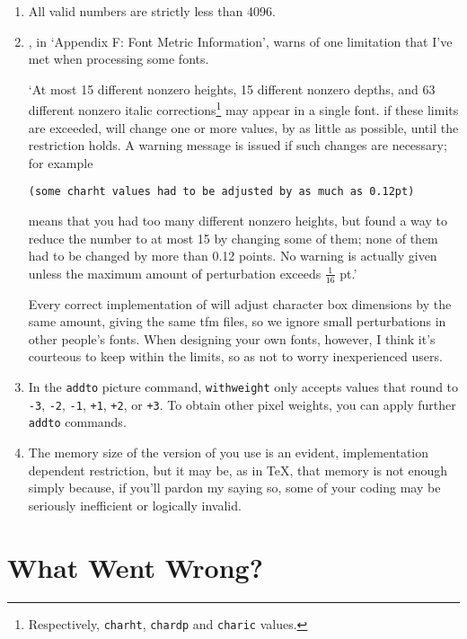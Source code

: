 \begin{enumerate}
\item
All valid numbers are strictly less than 4096.

\item
\MFbook{}, in `Appendix F: Font Metric Information',
warns of one limitation that I've met when processing some fonts.

`At most 15 different nonzero heights, 15 different nonzero depths,
and 63 different nonzero italic corrections\footnote{Respectively,
{\tt charht}, {\tt chardp} and {\tt charic} values.}
may appear in a single font.  if these limits are exceeded,
\MF{} will change one or more values, by as little as possible,
until the restriction holds.  A warning message is issued if such
changes are necessary; for example

{\small\tt (some charht values had to be adjusted by as much as 0.12pt)}

means that you had too many different nonzero heights, but \MF{}
found a way to reduce the number to at most 15 by changing some of them;
none of them had to be changed by more than 0.12 points.
No warning is actually given unless the maximum amount of perturbation
exceeds $\frac{1}{16}$ pt.'

Every correct implementation of \MF{} will adjust character box
dimensions by the same amount, giving the same {\sc tfm} files, so we
ignore small perturbations in other people's fonts.  When designing
your own fonts, however, I think it's courteous to keep within the
limits, so as not to worry inexperienced users.

\item
In the {\tt addto} picture command, {\tt withweight} only accepts
values that round to {\tt -3}, {\tt -2}, {\tt -1}, {\tt +1}, {\tt +2},
or {\tt +3}.  To obtain other pixel weights, you can apply further
{\tt addto} commands.

\item
The memory size of the version of \MF{} you use is an evident,
implementation dependent restriction, but it may be, as in TeX, that
memory is not enough simply because, if you'll pardon my saying so,
some of your coding may be seriously inefficient or logically invalid.
\end{enumerate}


\section{What Went Wrong?}

